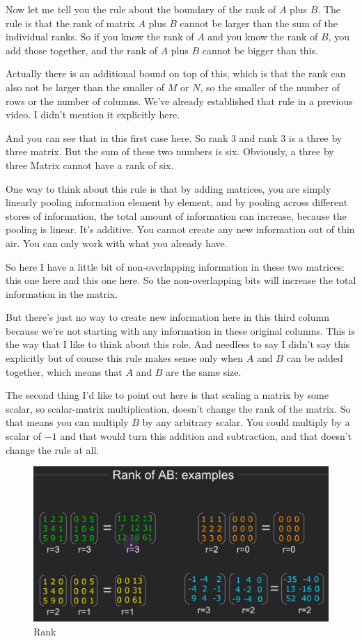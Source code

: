 \documentclass[fleqn,10pt]{olplainarticle}
\theoremstyle{definition}
\theoremstyle{remark}
\begin{document}
Now let me tell you the rule about the boundary of the rank of $A$ plus $B$. The rule is that the rank of matrix $A$ plus $B$ cannot be larger than the sum of the individual ranks. So if you know the rank of $A$ and you know the rank of $B$, you add those together, and the rank of $A$ plus $B$ cannot be bigger than this.

Actually there is an additional bound on top of this, which is that the rank can also not be larger than the smaller of $M$ or $N$, so the smaller of the number of rows or the number of columns. We've already established that rule in a previous video. I didn't mention it explicitly here. 

And you can see that in this first case here. So rank 3 and rank 3 is a three by three matrix. But the sum of these two numbers is six. Obviously, a three by three Matrix cannot have a rank of six.

One way to think about this rule is that by adding matrices, you are simply linearly pooling information element by element, and by pooling across different stores of information, the total amount of information can increase, because the pooling is linear. It's additive. You cannot create any new information out of thin air. You can only work with what you already have.

So here I have a little bit of non-overlapping information in these two matrices: this one here and this one here. So the non-overlapping bits will increase the total information in the matrix.

But there's just no way to create new information here in this third column because we're not starting with any information in these original columns. This is the way that I like to think about this role. And needless to say I didn't say this explicitly but of course this rule makes sense only when $A$ and $B$ can be added together, which means that $A$ and $B$ are the same size.

The second thing I'd like to point out here is that scaling a matrix by some scalar, so scalar-matrix multiplication, doesn't change the rank of the matrix. So that means you can multiply $B$ by any arbitrary scalar. You could multiply by a scalar of $-1$ and that would turn this addition and subtraction, and that doesn't change the rule at all.

\begin{figure}[ht]
	\centering
	\includegraphics[width=0.5\linewidth]{images/rank-20.png}
	\caption{Rank}
	\label{fig:rank_20}
\end{figure}
\end{document}
